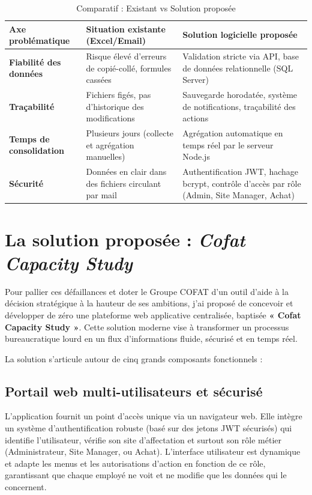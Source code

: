 \begin{table}[h]
\centering
\begin{tabular}{|p{4cm}|p{5cm}|p{6cm}|}
\hline
\textbf{Axe problématique} & \textbf{Situation existante (Excel/Email)} & \textbf{Solution logicielle proposée} \\ \hline
\textbf{Fiabilité des données} & Risque élevé d'erreurs de copié-collé, formules cassées & Validation stricte via API, base de données relationnelle (SQL Server) \\ \hline
\textbf{Traçabilité} & Fichiers figés, pas d'historique des modifications & Sauvegarde horodatée, système de notifications, traçabilité des actions \\ \hline
\textbf{Temps de consolidation} & Plusieurs jours (collecte et agrégation manuelles) & Agrégation automatique en temps réel par le serveur Node.js \\ \hline
\textbf{Sécurité} & Données en clair dans des fichiers circulant par mail & Authentification JWT, hachage bcrypt, contrôle d'accès par rôle (Admin, Site Manager, Achat) \\ \hline
\end{tabular}
\caption{Comparatif : Existant vs Solution proposée}
\label{tab:comparatif_existant}
\end{table}

\section{La solution proposée : \textit{Cofat Capacity Study}}
Pour pallier ces défaillances et doter le Groupe COFAT d'un outil d'aide à la décision stratégique à la hauteur de ses ambitions, j'ai proposé de concevoir et développer de zéro une plateforme web applicative centralisée, baptisée \textbf{« Cofat Capacity Study »}. Cette solution moderne vise à transformer un processus bureaucratique lourd en un flux d'informations fluide, sécurisé et en temps réel. 

La solution s'articule autour de cinq grands composants fonctionnels :

\subsection{Portail web multi-utilisateurs et sécurisé}
L'application fournit un point d'accès unique via un navigateur web. Elle intègre un système d'authentification robuste (basé sur des jetons JWT sécurisés) qui identifie l'utilisateur, vérifie son site d'affectation et surtout son rôle métier (Administrateur, Site Manager, ou Achat). L'interface utilisateur est dynamique et adapte les menus et les autorisations d'action en fonction de ce rôle, garantissant que chaque employé ne voit et ne modifie que les données qui le concernent.

